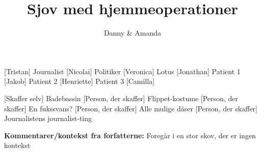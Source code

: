 \documentclass[a4paper,11pt]{article}
\title{Sjov med hjemmeoperationer}
\author{Danny \& Amanda}
\begin{document}
\maketitle

\begin{roles}
    [Tristan] Journalist
    [Nicolai] Politiker
    [Veronica] Lotus
    [Jonathan] Patient 1
    [Jakob] Patient 2
    [Henriette] Patient 3
    [Camilla]
\end{roles}

\begin{props}
    [Skaffer selv] Badebassin
    [Person, der skaffer] Flippet-kostume
    [Person, der skaffer] En fukssvans?
    [Person, der skaffer] Alle mulige dåser
    [Person, der skaffer] Journalistens journalist-ting
\end{props}

\textbf{Kommentarer/kontekst fra forfatterne:}
Foregår i en stor skov, der er ingen kontekst
\end{document}
